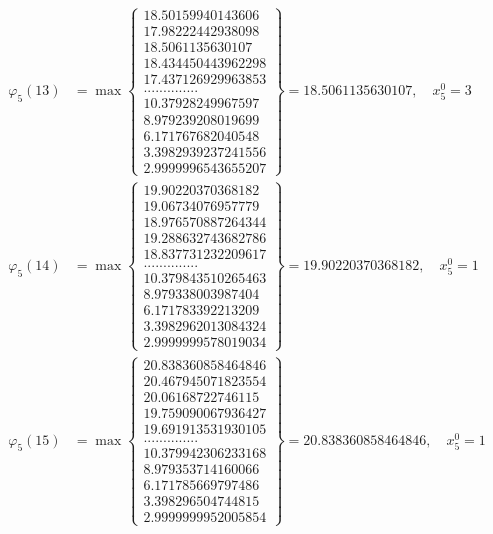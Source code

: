 \documentclass{article}
\begin{document}
\begin{align*}
  
  
  
\varphi_{5}(13) &= \max \left\{ \begin{array}{c}
18.50159940143606 \\
 17.98222442938098 \\
 18.5061135630107 \\
 18.434450443962298 \\
 17.437126929963853 \\
 .............. \\
 10.37928249967597 \\
 8.979239208019699 \\
 6.171767682040548 \\
 3.3982939237241556 \\
 2.9999996543655207
\end{array} \right\} = 18.5061135630107, \quad x_{5}^0 = 3\\
  
  
  
  
\varphi_{5}(14) &= \max \left\{ \begin{array}{c}
19.90220370368182 \\
 19.06734076957779 \\
 18.976570887264344 \\
 19.288632743682786 \\
 18.837731232209617 \\
 .............. \\
 10.379843510265463 \\
 8.979338003987404 \\
 6.171783392213209 \\
 3.3982962013084324 \\
 2.9999999578019034
\end{array} \right\} = 19.90220370368182, \quad x_{5}^0 = 1\\
  
  
  
  
\varphi_{5}(15) &= \max \left\{ \begin{array}{c}
20.838360858464846 \\
 20.467945071823554 \\
 20.06168722746115 \\
 19.759090067936427 \\
 19.691913531930105 \\
 .............. \\
 10.379942306233168 \\
 8.979353714160066 \\
 6.171785669797486 \\
 3.398296504744815 \\
 2.9999999952005854
\end{array} \right\} = 20.838360858464846, \quad x_{5}^0 = 1\\
  

\end{align*}
\end{document}
